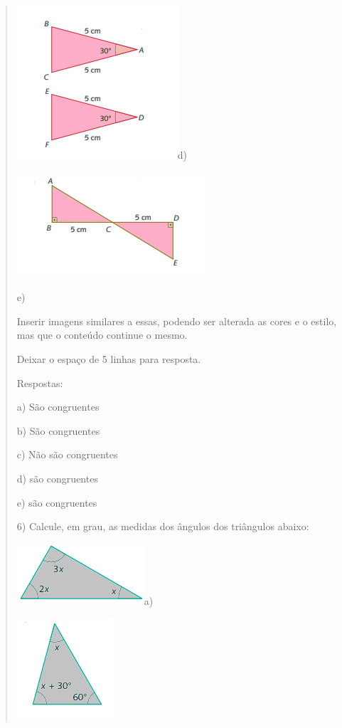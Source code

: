 \begin{quote}
\begin{escolha}
\includegraphics[width=2.35417in,height=2.23958in]{./imgSAEB_8_MAT/media/image22.png}d)

\includegraphics[width=2.73958in,height=1.54167in]{./imgSAEB_8_MAT/media/image23.png}

e)

Inserir imagens similares a essas, podendo ser alterada as cores e o
estilo, mas que o conteúdo continue o mesmo.

Deixar o espaço de 5 linhas para resposta.

Respostas:

a) São congruentes

b) São congruentes

c) Não são congruentes

d) são congruentes

e) são congruentes

6) Calcule, em grau, as medidas dos ângulos dos triângulos abaixo:

\includegraphics[width=1.86458in,height=0.89583in]{./imgSAEB_8_MAT/media/image24.png}a)

\includegraphics[width=1.40625in,height=1.47917in]{./imgSAEB_8_MAT/media/image25.png}


\end{escolha}
\end{quote}
